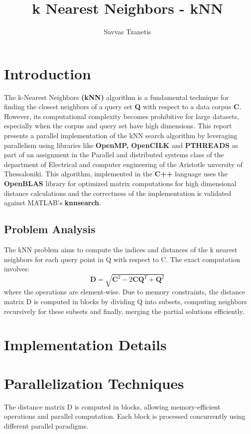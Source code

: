 \documentclass[12pt]{report}
\begin{document}
\title{\textbf{k Nearest Neighbors - kNN}}
\author{Savvas Tzanetis}
\maketitle  %

\tableofcontents  %

\chapter{Introduction}
The k-Nearest Neighbors \textbf{(kNN)} algorithm is a fundamental technique for finding the closest neighbors of a query set \textbf{Q} with respect to a data corpus \textbf{C}. However, its computational complexity becomes prohibitive for large datasets, especially when the corpus and query set have high dimensions. This report presents a parallel implementation of the kNN search algorithm by leveraging parallelism using libraries like \textbf{OpenMP, OpenCILK} and \textbf{PTHREADS} as part of an assignment in the Parallel and distributed systems class of the department of Electrical and computer engineering of the Aristotle unversity of Thessaloniki. This algorithm, implemented in the \textbf{C++} language uses the \textbf{OpenBLAS} library for optimized matrix computations for high dimensional distance calculations and the correctness of the implementation is validated against MATLAB's \textbf{knnsearch}.

\section{Problem Analysis}
The kNN problem aims to compute the indices and distances of the k nearest neighbors for each query point in Q with respect to C. The exact computation involves:
\[
\bm{D} = \sqrt{\bm{C}^2 - 2\bm{C}\bm{Q}^T + \bm{Q}^2}
\]
where the operations are element-wise.
Due to memory constraints, the distance matrix D is computed in blocks by dividing Q into subsets, computing neighbors recursively for these subsets and finally, merging the partial solutions efficiently.

\chapter{Implementation Details}

\chapter{Parallelization Techniques}
The distance matrix D is computed in blocks, allowing memory-efficient operations and parallel computation. Each block is processed concurrently using different parallel paradigms.
\end{document}
